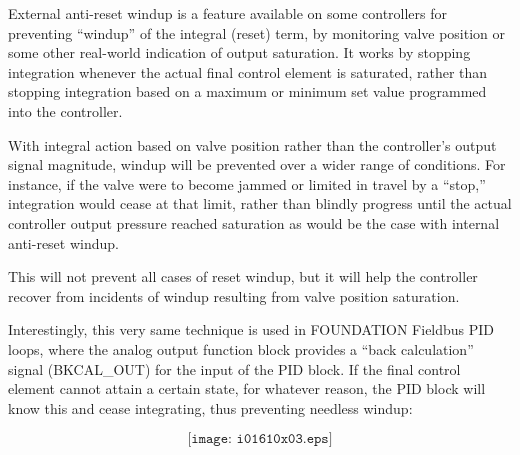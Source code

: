 





External anti-reset windup is a feature available on some controllers for preventing ``windup'' of the integral (reset) term, by monitoring valve position or some other real-world indication of output saturation.  It works by stopping integration whenever the actual final control element is saturated, rather than stopping integration based on a maximum or minimum set value programmed into the controller.

\vskip 10pt

With integral action based on valve position rather than the controller's output signal magnitude, windup will be prevented over a wider range of conditions.  For instance, if the valve were to become jammed or limited in travel by a ``stop,'' integration would cease at that limit, rather than blindly progress until the actual controller output pressure reached saturation as would be the case with internal anti-reset windup.

This will not prevent all cases of reset windup, but it will help the controller recover from incidents of windup resulting from valve position saturation.

\vskip 10pt

Interestingly, this very same technique is used in FOUNDATION Fieldbus PID loops, where the analog output function block provides a ``back calculation'' signal (BKCAL\_OUT) for the input of the PID block.  If the final control element cannot attain a certain state, for whatever reason, the PID block will know this and cease integrating, thus preventing needless windup:

$$\texttt{[image: i01610x03.eps]}$$











